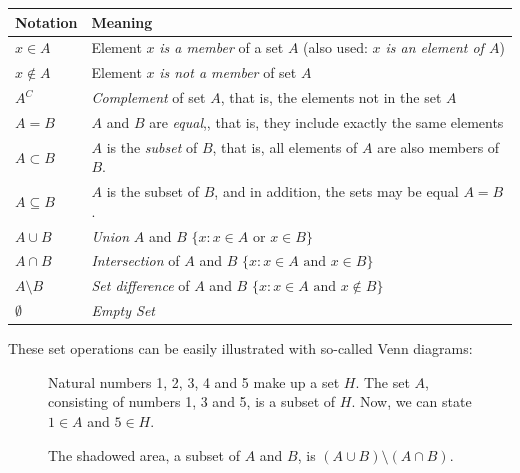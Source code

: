 \documentclass[12pt,a4paper,leqno]{report}
\theoremstyle{plain}
\theoremstyle{definition}
\begin{document}
\begin{tabular}{l l }
\toprule
Notation & Meaning \\
\midrule
$x \in A$  & Element $x$ \emph{is a member} \index{Set!Membership} of a set $A$ (also used: \emph{$x$ is an element of $A$})\\
$x \notin A$ & Element $x$ \emph{is not a member} of set $A$ \\
$A^C$ & \emph{Complement} of set $A$,\index{Set!Complement} that is, the elements not in the set $A$ \\
$A = B$ & $A$ and $B$ are \emph{equal},\index{Set!Equality}, that is, they include exactly the same elements\\
$A \subset B$ & $A$ is the \emph{subset} of $B$,\index{Set!Subset} that is, all elements of $A$ are also members of $B$. \\
$A \subseteq B$ & $A$ is the subset of $B$, and in addition, the sets may be equal $A=B$.\\
$A \cup B$ & \emph{Union}\index{Set!Union} $A$ and $B$ $\{x\colon x \in A \text{ or } x \in B\}$ \\
$A \cap B$ & \emph{Intersection}\index{Set!Intersection} of $A$ and $B$ $\{x\colon x \in A \text{ and } x \in B\}$\\
$A \setminus B$ & \emph{Set difference}\index{Set!Set difference} of $A$ and $B$  $\{x \colon x \in A \text{ and } x \notin B\}$ \\
$\emptyset$ & \emph{Empty Set}\index{Set!Empty set} \\
\bottomrule 
\end{tabular}
\bigskip

These set operations can be easily illustrated with so-called Venn diagrams:

\begin{figure}[!h]
\centering
{}
\caption{Natural numbers 1, 2, 3, 4 and 5 make up a set $H$. The set $A$, consisting of numbers 1, 3 and 5, is a subset of $H$. Now, we can state $1 \in A$ and $5 \in H$.} 
\end{figure}

\begin{figure}[!h]
\centering
{}
\caption{The shadowed area, a subset of $A$ and $B$, is $(A \cup B) \setminus (A \cap B)$.}
\end{figure}
\end{document}
